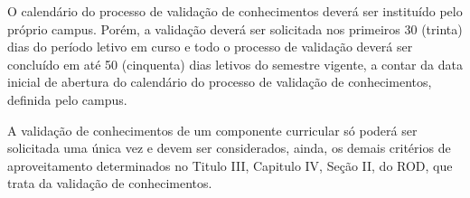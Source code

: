 O calendário do processo de validação de conhecimentos deverá ser instituído pelo próprio campus. Porém, a validação deverá ser solicitada nos primeiros 30 (trinta) dias do período letivo em curso e todo o processo de validação deverá ser concluído em até 50 (cinquenta) dias letivos do semestre vigente, a contar da data inicial de abertura do calendário do processo de validação de conhecimentos, definida pelo campus. 

A validação de conhecimentos de um componente curricular só poderá ser solicitada uma única vez e devem ser considerados, ainda, os demais critérios de aproveitamento determinados no Titulo III, Capitulo IV, Seção II, do ROD, que trata da validação de conhecimentos.
